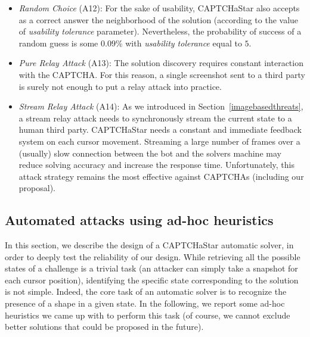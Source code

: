 \documentclass[conference]{IEEEtran}
\begin{document}
\begin{itemize}
\item\textit{Random Choice} (A12): For the sake of usability, CAPTCHaStar also accepts as a correct answer the neighborhood of the solution (according to the value of \textit{usability tolerance} parameter).
Nevertheless, the probability of success of a random guess is some $0.09$\% with \textit{usability tolerance} equal to $5$.
\item\textit{Pure Relay Attack} (A13): The solution discovery requires constant interaction with the CAPTCHA.
For this reason, a single screenshot sent to a third party is surely not enough to put a relay attack into practice.
\item\textit{Stream Relay Attack} (A14): As we introduced in Section~\ref{imagebasedthreats}, a stream relay attack needs to synchronously stream the current state to a human third party.
CAPTCHaStar needs a constant and immediate feedback system on each cursor movement.
Streaming a large number of frames over a (usually) slow connection between the bot and the solvers machine may reduce solving accuracy and increase the response time.
Unfortunately, this attack strategy remains the most effective against CAPTCHAs (including our proposal).
\end{itemize}

\subsection{Automated attacks using ad-hoc heuristics}
\label{adhocattacks}
In this section, we describe the design of a CAPTCHaStar automatic solver, in order to deeply test the reliability of our design. While retrieving all the possible states of a challenge is a trivial task (an attacker can simply take a snapshot for each cursor position), identifying the specific state corresponding to the solution is not simple. Indeed, the core task of an automatic solver is to recognize the presence of a shape in a given state. In the following, we report some ad-hoc heuristics we came up with to perform this task (of course, we cannot exclude better solutions that could be proposed in the future).
\end{document}
